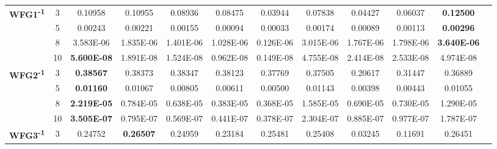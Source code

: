 \documentclass{sig-alternate}
\begin{document}
\begin{table}[!htb]
\begin{tabular}{|c|c|c|c|c|c|c|c|c|c|c|c|}
\multirow{4}{*}{\textbf{WFG1\textsuperscript{-1}}}  & 3          & 0.10958            & 0.10955            & 0.08936               & 0.08475          & 0.03944             & 0.07838             & 0.04427            & 0.06037              & \textbf{0.12500}   \\ \cline{2-11} 
                                                      & 5          & 0.00243            & 0.00221            & 0.00155               & 0.00094          & 0.00033             & 0.00174             & 0.00089            & 0.00113              & \textbf{0.00296}   \\ \cline{2-11} 
                                                      & 8          & 3.583E-06          & 1.835E-06          & 1.401E-06             & 1.028E-06        & 0.126E-06           & 3.015E-06           & 1.767E-06          & 1.798E-06            & \textbf{3.640E-06} \\ \cline{2-11} 
                                                      & 10         & \textbf{5.600E-08} & 1.891E-08          & 1.524E-08             & 0.962E-08        & 0.149E-08           & 4.755E-08           & 2.414E-08          & 2.533E-08            & 4.974E-08          \\ \hline
\multirow{4}{*}{\textbf{WFG2\textsuperscript{-1}}}  & 3          & \textbf{0.38567}   & 0.38373            & 0.38347               & 0.38123          & 0.37769             & 0.37505             & 0.20617            & 0.31447              & 0.36889            \\ \cline{2-11} 
                                                      & 5          & \textbf{0.01160}   & 0.01067            & 0.00805               & 0.00611          & 0.00500             & 0.01143             & 0.00398            & 0.00443              & 0.01055            \\ \cline{2-11} 
                                                      & 8          & \textbf{2.219E-05} & 0.784E-05          & 0.638E-05             & 0.383E-05        & 0.368E-05           & 1.585E-05           & 0.690E-05          & 0.730E-05            & 1.290E-05          \\ \cline{2-11} 
                                                      & 10         & \textbf{3.505E-07} & 0.795E-07          & 0.569E-07             & 0.441E-07        & 0.378E-07           & 2.304E-07           & 0.885E-07          & 0.977E-07            & 1.787E-07          \\ \hline
\multirow{4}{*}{\textbf{WFG3\textsuperscript{-1}}}  & 3          & 0.24752            & \textbf{0.26507}   & 0.24959               & 0.23184          & 0.25481             & 0.25408             & 0.03245            & 0.11691              & 0.26451            \\ \cline{2-11} 

\end{tabular}
\end{table}
\end{document}
